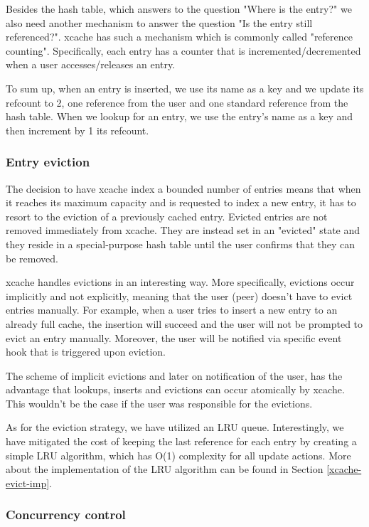Besides the hash table, which answers to the question "Where is the entry?" we 
also need another mechanism to answer the question "Is the entry still 
referenced?". xcache has such a mechanism which is commonly called "reference 
counting". Specifically, each entry has a counter that is 
incremented/decremented when a user accesses/releases an entry.

To sum up, when an entry is inserted, we use its name as a key and we update 
its refcount to 2, one reference from the user and one standard reference from 
the hash table. When we lookup for an entry, we use the entry's name as a key 
and then increment by 1 its refcount. 

\subsubsection{Entry eviction}\label{xcache-eviction-design}

The decision to have xcache index a bounded number of entries means that when 
it reaches its maximum capacity and is requested to index a new entry, it has 
to resort to the eviction of a previously cached entry. Evicted entries are not 
removed immediately from xcache. They are instead set in an "evicted" state and 
they reside in a special-purpose hash table until the user confirms that they 
can be removed. 

xcache handles evictions in an interesting way. More specifically, evictions 
occur implicitly and not explicitly, meaning that the user (peer) doesn't have 
to evict entries manually. For example, when a user tries to insert a new entry 
to an already full cache, the insertion will succeed and the user will not be 
prompted to evict an entry manually. Moreover, the user will be notified via 
specific event hook that is triggered upon eviction.

The scheme of implicit evictions and later on notification of the user, has the 
advantage that lookups, inserts and evictions can occur atomically by xcache.  
This wouldn't be the case if the user was responsible for the evictions.

As for the eviction strategy, we have utilized an LRU queue. Interestingly, we 
have mitigated the cost of keeping the last reference for each entry by 
creating a simple LRU algorithm, which has O(1) complexity for all update 
actions. More about the implementation of the LRU algorithm can be found in 
Section \ref{xcache-evict-imp}.

\subsubsection{Concurrency control}

